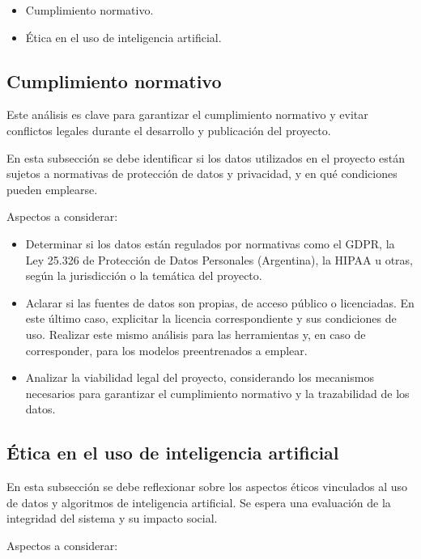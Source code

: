 \documentclass[
11pt, %
codirector, %
]{charter}
\begin{document}
\begin{itemize}
  \item Cumplimiento normativo.
  \item Ética en el uso de inteligencia artificial.
\end{itemize}

\subsection{Cumplimiento normativo}
Este análisis es clave para garantizar el cumplimiento normativo y evitar conflictos legales durante el desarrollo y publicación del proyecto.

En esta subsección se debe identificar si los datos utilizados en el proyecto están sujetos a normativas de protección de datos y privacidad, y en qué condiciones pueden emplearse.

Aspectos a considerar:

\begin{itemize}
  \item Determinar si los datos están regulados por normativas como el GDPR, la Ley 25.326 de Protección de Datos Personales (Argentina), la HIPAA u otras, según la jurisdicción o la temática del proyecto.
  \item Aclarar si las fuentes de datos son propias, de acceso público o licenciadas. En este último caso, explicitar la licencia correspondiente y sus condiciones de uso. Realizar este mismo análisis para las herramientas y, en caso de corresponder, para los modelos preentrenados a emplear.
  \item Analizar la viabilidad legal del proyecto, considerando los mecanismos necesarios para garantizar el cumplimiento normativo y la trazabilidad de los datos.
\end{itemize}

\subsection{Ética en el uso de inteligencia artificial}

En esta subsección se debe reflexionar sobre los aspectos éticos vinculados al uso de datos y algoritmos de inteligencia artificial. Se espera una evaluación de la integridad del sistema y su impacto social.

Aspectos a considerar:
\end{document}
